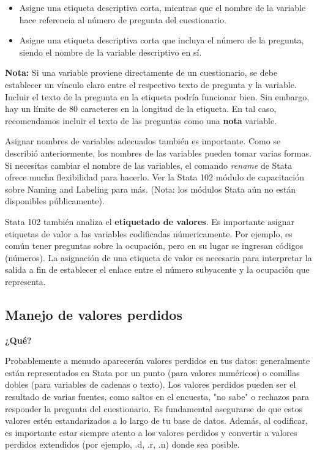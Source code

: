 \documentclass[11pt,en]{elegantpaper}
\begin{document}
\begin{itemize}
	\item Asigne una etiqueta descriptiva corta, mientras que el nombre de la variable hace referencia al número de pregunta del cuestionario.
	
	\item Asigne una etiqueta descriptiva corta que incluya el número de la pregunta, siendo el nombre de la variable descriptivo en sí.
\end{itemize}

\textbf{Nota:} Si una variable proviene directamente de un cuestionario, se debe establecer un vínculo claro entre el respectivo texto de pregunta y la variable. Incluir el texto de la pregunta en la etiqueta podría funcionar bien. Sin embargo, hay un límite de 80 caracteres en la longitud de la etiqueta. En tal caso, recomendamos incluir el texto de las preguntas como una \textbf{nota} variable.

Asignar nombres de variables adecuados también es importante. Como se describió anteriormente, los nombres de las variables pueden tomar varias formas. Si necesitas cambiar el nombre de las variables, el comando \textit{rename} de Stata ofrece mucha flexibilidad para hacerlo. Ver la Stata 102 módulo de capacitación sobre Naming and Labeling para más. (Nota: los módulos Stata aún no están disponibles públicamente).

Stata 102 también analiza el \textbf{etiquetado de valores}. Es importante asignar etiquetas de valor a las variables codificadas númericamente. Por ejemplo, es común tener preguntas sobre la ocupación, pero en su lugar se ingresan códigos (números). La asignación de una etiqueta de valor es necesaria para interpretar la salida a fin de establecer el enlace entre el número subyacente y la ocupación que representa.

\subsection{Manejo de valores perdidos}
\label{sec:missings}
\noindent
\textbf{¿Qué?}

Probablemente a menudo aparecerán valores perdidos en tus datos: generalmente están representados en Stata por un punto (para valores numéricos) o comillas dobles (para variables de cadenas o texto). Los valores perdidos pueden ser el resultado de varias fuentes, como saltos en el encuesta, "no sabe" o rechazos para responder la pregunta del cuestionario. Es fundamental asegurarse de que estos valores estén estandarizados a lo largo de tu base de datos. Además, al codificar, es importante estar siempre atento a los valores perdidos y convertir a valores perdidos extendidos (por ejemplo, .d, .r, .n) donde sea posible.
\end{document}
